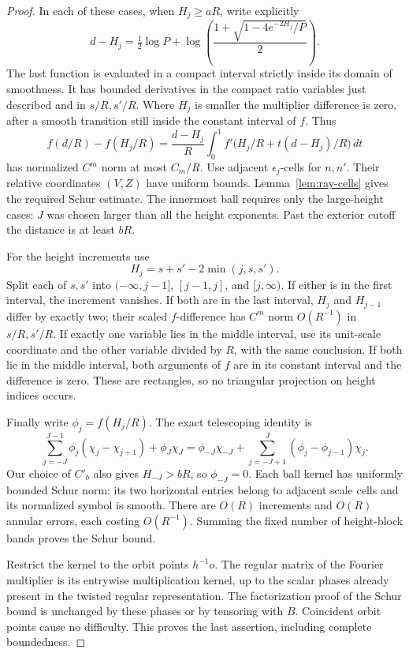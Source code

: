 \begin{proof}
In each of these cases, when \(H_j\ge aR\), write explicitly
\[
 d-H_j=\tfrac12\log P+
 \log\left(\frac{1+\sqrt{1-4e^{-2H_j}/P}}2\right).
\]
The last function is evaluated in a compact interval strictly inside
its domain of smoothness.  It has bounded derivatives in the compact
ratio variables just described and in \(s/R,s'/R\).  Where \(H_j\)
is smaller the multiplier difference is zero, after a smooth
transition still inside the constant interval of \(f\).  Thus
\[
 f(d/R)-f(H_j/R)
 =\frac{d-H_j}{R}\int_0^1
             f'\bigl(H_j/R+t(d-H_j)/R\bigr)\,dt
\]
has normalized \(C^m\) norm at most \(C_m/R\).  Use adjacent
\(\epsilon_j\)-cells for \(n,n'\).  Their relative coordinates
\((V,Z)\) have uniform bounds.  Lemma~\ref{lem:ray-cells}
gives the required Schur estimate.  The innermost ball requires only
the large-height cases: \(J\) was chosen larger than all the height
exponents.  Past the exterior cutoff the distance is at least \(bR\).

For the height increments use
\[
 H_j=s+s'-2\min(j,s,s').
\]
Split each of \(s,s'\) into \(( -\infty,j-1]\), \([j-1,j]\),
and \([j,\infty)\).  If either is in the first interval, the
increment vanishes.  If both are in the last interval, \(H_j\)
and \(H_{j-1}\) differ by exactly two; their scaled \(f\)-difference
has \(C^m\) norm \(O(R^{-1})\) in \(s/R,s'/R\).  If exactly one
variable lies in the middle interval, use its unit-scale coordinate
and the other variable divided by \(R\), with the same conclusion.
If both lie in the middle interval, both arguments of \(f\) are in
its constant interval and the difference is zero.  These are
rectangles, so no triangular projection on height indices occurs.

Finally write \(\phi_j=f(H_j/R)\).  The exact telescoping identity is
\[
 \sum_{j=-J}^{J-1}\phi_j(\chi_j-\chi_{j+1})+\phi_J\chi_J
 =\phi_{-J}\chi_{-J}
       +\sum_{j=-J+1}^J(\phi_j-\phi_{j-1})\chi_j.
\]
Our choice of \(C'_b\) also gives \(H_{-J}>bR\), so
\(\phi_{-J}=0\).  Each ball kernel has uniformly bounded Schur norm:
its two horizontal entries belong to adjacent scale cells and its
normalized symbol is smooth.  There are \(O(R)\) increments and
\(O(R)\) annular errors, each costing \(O(R^{-1})\).  Summing the
fixed number of height-block bands proves the Schur bound.

Restrict the kernel to the orbit points \(h^{-1}o\).  The regular
matrix of the Fourier multiplier is its entrywise multiplication
kernel, up to the scalar phases already present in the twisted
regular representation.  The factorization proof of the Schur bound
is unchanged by these phases or by tensoring with \(B\).
Coincident orbit points cause no difficulty.  This proves the last
assertion, including complete boundedness.
\end{proof}

